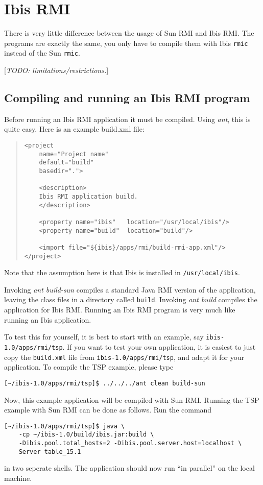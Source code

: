\documentclass[10pt]{article}
\newcommand{\mysection}[1]{\section{#1}\label{#1}}
\newcommand{\mysubsection}[1]{\subsection{#1}\label{#1}}
\newcommand{\remark}[1]{[\emph{#1}]}
\begin{document}
\mysection{Ibis RMI}

There is very little difference between the usage of Sun RMI and Ibis
RMI. The programs are exactly the same, you only have to compile them
with Ibis \texttt{rmic} instead of the Sun \texttt{rmic}. 

\remark{TODO: limitations/restrictions.}


\mysubsection{Compiling and running an Ibis RMI program}

Before running an Ibis RMI application it must be compiled.
Using \emph{ant}, this is quite easy. Here is an example build.xml file:

\begin{quote}
\begin{verbatim}
<project
    name="Project name"
    default="build"
    basedir=".">

    <description>
    Ibis RMI application build.
    </description>

    <property name="ibis"   location="/usr/local/ibis"/>
    <property name="build"  location="build"/>

    <import file="${ibis}/apps/rmi/build-rmi-app.xml"/>
</project>
\end{verbatim}
\end{quote}
Note that the assumption here is that Ibis is installed in
\texttt{/usr/local/ibis}.

Invoking \emph{ant build-sun} compiles a standard Java RMI version of
the application, leaving the class files in a directory called \texttt{build}.
Invoking \emph{ant build} compiles the application for Ibis RMI.
Running an Ibis RMI program is very much like running an Ibis application.

To test this for yourself, it is best to start with
an example, say \texttt{ibis-1.0/apps/rmi/tsp}. 
If you want to test your own application, it is easiest to just copy
the \texttt{build.xml} file from \texttt{ibis-1.0/apps/rmi/tsp}, and adapt it for your
application. 
To compile the TSP example, please type
\begin{verbatim}
[~/ibis-1.0/apps/rmi/tsp]$ ../../../ant clean build-sun
\end{verbatim}
\noindent
Now, this example application will be compiled with Sun RMI.
Running the TSP example with Sun RMI can be done as follows. Run the command
\begin{verbatim}
[~/ibis-1.0/apps/rmi/tsp]$ java \
    -cp ~/ibis-1.0/build/ibis.jar:build \
    -Dibis.pool.total_hosts=2 -Dibis.pool.server.host=localhost \
    Server table_15.1 
\end{verbatim}
\noindent
in two seperate shells. The application should now run ``in parallel''
on the local machine.  
\end{document}

